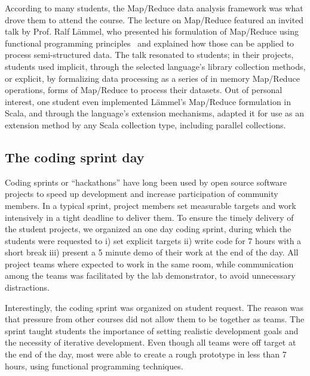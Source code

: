 \documentclass[conference]{IEEEtran}
\begin{document}
According to many students, the Map/Reduce data analysis framework was what
drove them to attend the course. The lecture on Map/Reduce featured an invited
talk by Prof. Ralf L\"ammel, who presented his formulation of Map/Reduce using
functional programming principles~\cite{Lamme08} and explained how those can be
applied to process semi-structured data. The talk resonated to students; in
their projects, students used implicit, through the selected language's library
collection methods, or explicit, by formalizing data processing as a series of
in memory Map/Reduce operations, forms of Map/Reduce to process their datasets.
Out of personal interest, one student even implemented L\"ammel's Map/Reduce
formulation in Scala, and through the language's extension mechanisms, adapted
it for use as an extension method by any Scala collection type, including
parallel collections. 

\subsection{The coding sprint day}

Coding sprints or ``hackathons'' have long been used by open source software
projects to speed up development and increase participation of community
members. In a typical sprint, project members set measurable
targets and work intensively in a tight deadline to deliver them. To ensure the
timely delivery of the student projects, we organized an one day coding sprint,
during which the students were requested to i) set explicit targets ii) write
code for 7 hours with a short break iii) present a 5 minute demo of their work
at the end of the day. All project teams where expected to work in the same
room, while communication among the teams was facilitated by the lab
demonstrator, to avoid unnecessary distractions.

Interestingly, the coding sprint was organized on student request. The reason
was that pressure from other courses did not allow them to be together as teams.
The sprint taught students the importance of setting realistic development goals
and the necessity of iterative development. Even though all teams were off
target at the end of the day, most were able to create a rough prototype in less
than 7 hours, using functional programming techniques. 

%
%
\end{document}
